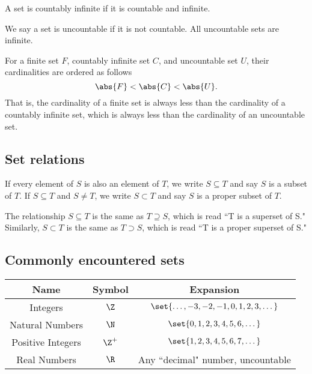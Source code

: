 \documentclass[12pt,paper=letter]{article}
\begin{document}
    \begin{defboxed}
        A set is countably infinite if it is countable and infinite.
    \end{defboxed}

    \begin{defboxed}
        We say a set is uncountable if it is not countable.
        All uncountable sets are infinite.
    \end{defboxed}

    \begin{defboxed}
        For a finite set $F$,
        countably infinite set $C$,
        and uncountable set $U$,
        their cardinalities are ordered as follows
        \[
            \abs{F}<\abs{C}<\abs{U}.
        \]
        That is,
        the cardinality of a finite set is always less than the cardinality of a countably infinite set,
        which is always less than the cardinality of an uncountable set.
    \end{defboxed}

    \subsection{Set relations}

    \begin{defboxed}
        If every element of $S$ is also an element of $T$,
        we write $S\subseteq T$ and say $S$ is a subset of $T$.
        If $S\subseteq T$ and $S\ne T$,
        we write $S\subset T$ and say $S$ is a proper subset of $T$.
    \end{defboxed}
    \begin{defboxed}
        The relationship $S\subseteq T$ is the same as $T\supseteq S$,
        which is read ``T is a superset of S."
        Similarly, $S\subset T$ is the same as $T\supset S$,
        which is read ``T is a proper superset of S."
    \end{defboxed}

    \subsection{Commonly encountered sets}

    \begin{tabular}{|c|c|c|}
        \hline
        Name & Symbol & Expansion\\
        \hline
        Integers & $\Z$ & $\set{\dots, -3, -2, -1, 0, 1, 2, 3, \dots}$\\
        Natural Numbers & $\N$ & $\set{0, 1, 2, 3, 4, 5, 6, \dots}$\\
        Positive Integers & $\Z^+$ & $\set{1, 2, 3, 4, 5, 6, 7, \dots}$\\
        Real Numbers & $\R$ & Any ``decimal" number, uncountable\\
        \hline
    \end{tabular}
\end{document}
